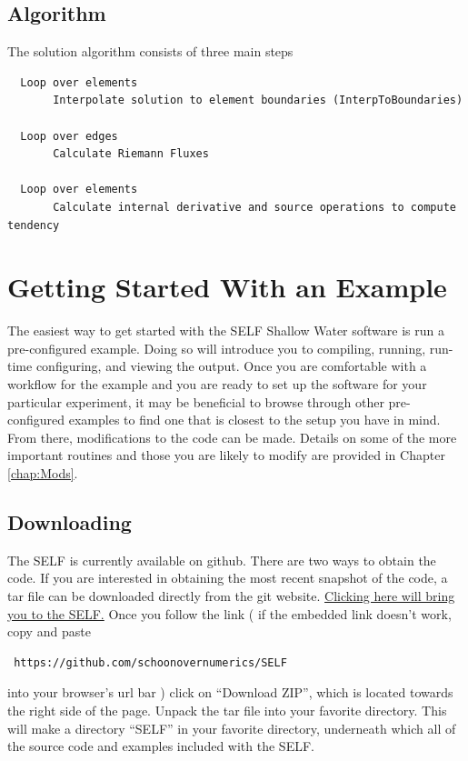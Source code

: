 \documentclass{softwaremanual}
\begin{document}
\section{Algorithm}

The solution algorithm consists of three main steps
\begin{verbatim}
  Loop over elements
       Interpolate solution to element boundaries (InterpToBoundaries)
       
  Loop over edges
       Calculate Riemann Fluxes
       
  Loop over elements
       Calculate internal derivative and source operations to compute tendency
\end{verbatim}
\chapter{Getting Started With an Example}
The easiest way to get started with the SELF Shallow Water software is run a pre-configured example. Doing so will introduce you to compiling, running, run-time configuring, and viewing the output. Once you are comfortable with a workflow for the example and you are ready to set up the software for your particular experiment, it may be beneficial to browse through other pre-configured examples to find one that is closest to the setup you have in mind. From there, modifications to the code can be made. Details on some of the more important routines and those you are likely to modify are provided in Chapter \ref{chap:Mods}.

\section{Downloading}
The SELF is currently available on github. There are two ways to obtain the code. If you are interested in obtaining the most recent snapshot of the code, a tar file can be downloaded directly from the git website.  \href{https://github.com/schoonovernumerics/SELF}{Clicking here will bring you to the SELF.} Once you follow the link ( if the embedded link doesn't work, copy and paste
\begin{verbatim}
 https://github.com/schoonovernumerics/SELF 
\end{verbatim}
into your browser's url bar ) click on ``Download ZIP'', which is located towards the right side of the page. Unpack the tar file into your favorite directory. This will make a directory ``SELF'' in your favorite directory, underneath which all of the source code and examples included with the SELF. 
\end{document}
